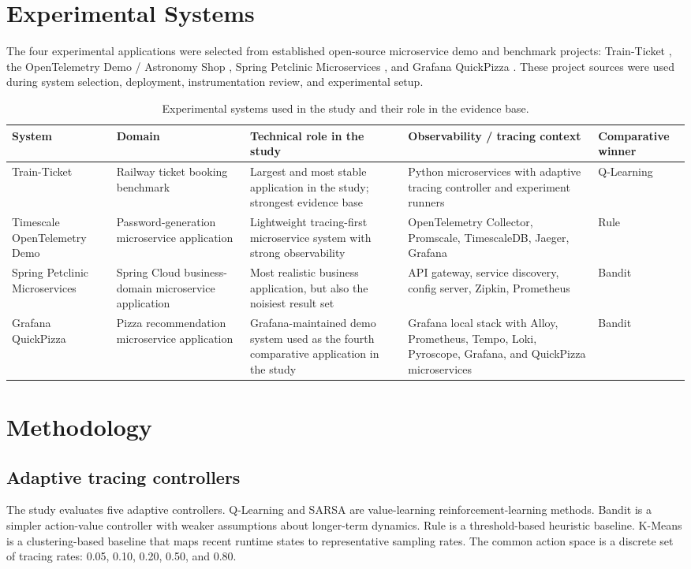 \documentclass[10pt,twocolumn]{article}
\begin{document}
\section{Experimental Systems}
The four experimental applications were selected from established open-source microservice demo and benchmark projects: Train-Ticket \cite{trainrepo}, the OpenTelemetry Demo / Astronomy Shop \cite{otelrepo,oteldemo}, Spring Petclinic Microservices \cite{petrepo,petsite}, and Grafana QuickPizza \cite{quickrepo}. These project sources were used during system selection, deployment, instrumentation review, and experimental setup.
\begin{table}[t]
\centering
\small
\caption{Experimental systems used in the study and their role in the evidence base.}
\begin{tabularx}{\textwidth}{p{2.4cm}p{2.1cm}X X p{1.8cm}}
\toprule
System & Domain & Technical role in the study & Observability / tracing context & Comparative winner \\
\midrule
Train-Ticket & Railway ticket booking benchmark & Largest and most stable application in the study; strongest evidence base & Python microservices with adaptive tracing controller and experiment runners & Q-Learning \\
Timescale OpenTelemetry Demo & Password-generation microservice application & Lightweight tracing-first microservice system with strong observability & OpenTelemetry Collector, Promscale, TimescaleDB, Jaeger, Grafana & Rule \\
Spring Petclinic Microservices & Spring Cloud business-domain microservice application & Most realistic business application, but also the noisiest result set & API gateway, service discovery, config server, Zipkin, Prometheus & Bandit \\
Grafana QuickPizza & Pizza recommendation microservice application & Grafana-maintained demo system used as the fourth comparative application in the study & Grafana local stack with Alloy, Prometheus, Tempo, Loki, Pyroscope, Grafana, and QuickPizza microservices & Bandit \\
\bottomrule
\end{tabularx}
\end{table}

\section{Methodology}
\subsection{Adaptive tracing controllers}
The study evaluates five adaptive controllers. Q-Learning and SARSA are value-learning reinforcement-learning methods. Bandit is a simpler action-value controller with weaker assumptions about longer-term dynamics. Rule is a threshold-based heuristic baseline. K-Means is a clustering-based baseline that maps recent runtime states to representative sampling rates. The common action space is a discrete set of tracing rates: 0.05, 0.10, 0.20, 0.50, and 0.80.
\end{document}
